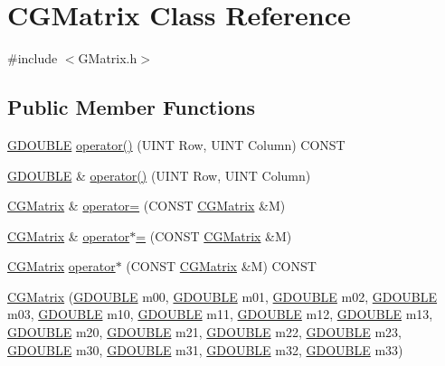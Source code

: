 \hypertarget{class_c_g_matrix}{}\section{C\+G\+Matrix Class Reference}
\label{class_c_g_matrix}


{\ttfamily \#include $<$G\+Matrix.\+h$>$}

\subsection*{Public Member Functions}
\begin{DoxyCompactItemize}
\item 
\hyperlink{_g_types_8h_afd05ac85f90ee8e2a733928545462cd4}{G\+D\+O\+U\+B\+L\+E} \hyperlink{class_c_g_matrix_a7723aab93c1ee70abf6ad801d47941e8}{operator()} (U\+I\+N\+T Row, U\+I\+N\+T Column) C\+O\+N\+S\+T
\item 
\hyperlink{_g_types_8h_afd05ac85f90ee8e2a733928545462cd4}{G\+D\+O\+U\+B\+L\+E} \& \hyperlink{class_c_g_matrix_ae3d22aeb6a059f5f3013f1adc7bf584e}{operator()} (U\+I\+N\+T Row, U\+I\+N\+T Column)
\item 
\hyperlink{class_c_g_matrix}{C\+G\+Matrix} \& \hyperlink{class_c_g_matrix_af028d8764e7ff98f01d1e97198ab062f}{operator=} (C\+O\+N\+S\+T \hyperlink{class_c_g_matrix}{C\+G\+Matrix} \&M)
\item 
\hyperlink{class_c_g_matrix}{C\+G\+Matrix} \& \hyperlink{class_c_g_matrix_a66c53877cb3df970e1fe6cd8657df7df}{operator$\ast$=} (C\+O\+N\+S\+T \hyperlink{class_c_g_matrix}{C\+G\+Matrix} \&M)
\item 
\hyperlink{class_c_g_matrix}{C\+G\+Matrix} \hyperlink{class_c_g_matrix_a10deb8bf96fb18109955797f71591400}{operator$\ast$} (C\+O\+N\+S\+T \hyperlink{class_c_g_matrix}{C\+G\+Matrix} \&M) C\+O\+N\+S\+T
\item 
\hyperlink{class_c_g_matrix_aea77037ff8e090dd861be15626fa3b28}{C\+G\+Matrix} (\hyperlink{_g_types_8h_afd05ac85f90ee8e2a733928545462cd4}{G\+D\+O\+U\+B\+L\+E} m00, \hyperlink{_g_types_8h_afd05ac85f90ee8e2a733928545462cd4}{G\+D\+O\+U\+B\+L\+E} m01, \hyperlink{_g_types_8h_afd05ac85f90ee8e2a733928545462cd4}{G\+D\+O\+U\+B\+L\+E} m02, \hyperlink{_g_types_8h_afd05ac85f90ee8e2a733928545462cd4}{G\+D\+O\+U\+B\+L\+E} m03, \hyperlink{_g_types_8h_afd05ac85f90ee8e2a733928545462cd4}{G\+D\+O\+U\+B\+L\+E} m10, \hyperlink{_g_types_8h_afd05ac85f90ee8e2a733928545462cd4}{G\+D\+O\+U\+B\+L\+E} m11, \hyperlink{_g_types_8h_afd05ac85f90ee8e2a733928545462cd4}{G\+D\+O\+U\+B\+L\+E} m12, \hyperlink{_g_types_8h_afd05ac85f90ee8e2a733928545462cd4}{G\+D\+O\+U\+B\+L\+E} m13, \hyperlink{_g_types_8h_afd05ac85f90ee8e2a733928545462cd4}{G\+D\+O\+U\+B\+L\+E} m20, \hyperlink{_g_types_8h_afd05ac85f90ee8e2a733928545462cd4}{G\+D\+O\+U\+B\+L\+E} m21, \hyperlink{_g_types_8h_afd05ac85f90ee8e2a733928545462cd4}{G\+D\+O\+U\+B\+L\+E} m22, \hyperlink{_g_types_8h_afd05ac85f90ee8e2a733928545462cd4}{G\+D\+O\+U\+B\+L\+E} m23, \hyperlink{_g_types_8h_afd05ac85f90ee8e2a733928545462cd4}{G\+D\+O\+U\+B\+L\+E} m30, \hyperlink{_g_types_8h_afd05ac85f90ee8e2a733928545462cd4}{G\+D\+O\+U\+B\+L\+E} m31, \hyperlink{_g_types_8h_afd05ac85f90ee8e2a733928545462cd4}{G\+D\+O\+U\+B\+L\+E} m32, \hyperlink{_g_types_8h_afd05ac85f90ee8e2a733928545462cd4}{G\+D\+O\+U\+B\+L\+E} m33)

\end{DoxyCompactItemize}
